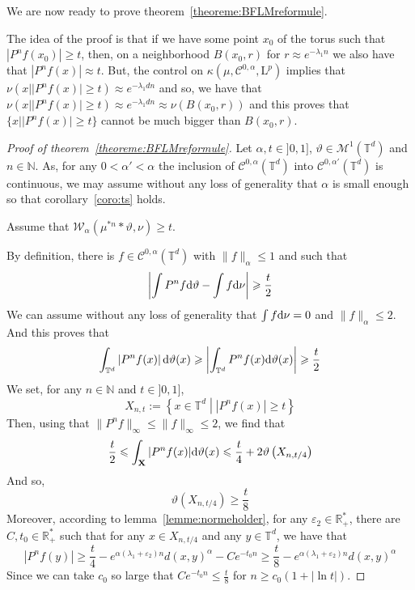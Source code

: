 \documentclass[11pt]{amsart}
\theoremstyle{definition}
\theoremstyle{remark}
\numberwithin{equation}{section}
\begin{document}
We are now ready to prove theorem~\ref{theoreme:BFLMreformule}.

The idea of the proof is that if we have some point $x_0$ of the torus such that $|P^nf(x_0)| \geqslant t$, then, on a neighborhood $B(x_0,r)$  for $r\approx e^{-\lambda_1 n}$ we also have that $|P^n f(x)| \approx t$. But, the control on $\kappa(\mu,\mathcal{C}^{0,\alpha}, \mathrm{L}^p)$ implies that $\nu(x| |P^n f(x)| \geqslant t) \approx e^{-\lambda_1 dn}$ and so, we have that $\nu(x| |P^n f(x)| \geqslant t) \approx e^{-\lambda_1 dn}\approx \nu(B(x_0,r))$ and this proves that $\{ x ||P^n f(x)| \geqslant t\}$ cannot be much bigger than $B(x_0,r)$.

\begin{proof}[Proof of theorem~\ref{theoreme:BFLMreformule}]
Let $\alpha,t\in ]0,1]$, $\vartheta \in \mathcal{M}^1({\mathbb T}^d)$ and $n\in {\mathbb N}$. As, for any $0<\alpha'<\alpha$ the inclusion of $\mathcal{C}^{0,\alpha}({\mathbb T}^d)$ into $\mathcal{C}^{0,\alpha'}({\mathbb T}^d)$ is continuous, we may assume without any loss of generality that $\alpha$ is small enough so that corollary~\ref{coro:ts} holds.

Assume that $\mathcal{W}_\alpha(\mu^{\ast n} \ast \vartheta,\nu)\geqslant t$.

By definition, there is $f\in \mathcal{C}^{0,\alpha}({\mathbb T}^d)$ with $\|f\|_\alpha\leqslant 1$ and such that
\[
\left|\int P^n f{{\rm d}}\vartheta - \int f {{\rm d}}\nu \right| \geqslant \frac t 2
\]
We can assume without any loss of generality that $\int f{{\rm d}}\nu=0$ and $\|f\|_\alpha \leqslant 2$.
And this proves that
\[
\int_{{\mathbb T}^d} \left|P^n f(x)\right| {{\rm d}}\vartheta(x) \geqslant  \left|\int_{{\mathbb T}^d}P^n f(x) {{\rm d}}\vartheta(x)\right| \geqslant \frac t 2
\]
We set, for any $n\in {\mathbb N}$ and $t\in ]0,1]$,
\[
X_{n,t} := \left\{x\in {\mathbb T}^d \middle| \left|P^n f(x)\right| \geqslant t\right\}
\]
Then, using that $\|P^n f\|_\infty \leqslant \|f\|_\infty \leqslant 2$, we find that
\[
\frac t 2 \leqslant \int_{\mathbf X} |P^n f(x)| {{\rm d}}\vartheta(x) \leqslant \frac t 4 + 2 \vartheta\left(X_{n,t/4} \right) 
\]
And so,
\[
 \vartheta\left( X_{n,t/4}  \right) \geqslant \frac t 8
\]
Moreover, according to lemma~\ref{lemme:normeholder}, for any $\varepsilon_2\in {\mathbb R}_+^\ast$, there are $C,t_0\in {\mathbb R}_+^\ast$ such that for any $x\in X_{n,t/4}$ and any $y\in {\mathbb T}^d$, we have that
\[
|P^n f(y)| \geqslant \frac t 4-e^{\alpha(\lambda_1 + \varepsilon_2)n} d(x,y)^{\alpha} - Ce^{-t_0 n} \geqslant \frac t 8 -e^{\alpha(\lambda_1 + \varepsilon_2)n} d(x,y)^{\alpha}
\]
Since we can take $c_0$ so large that $Ce^{-t_0 n} \leqslant \frac t 8$ for $n\geqslant c_0(1+|\ln t|)$.


\end{proof}
\end{document}
